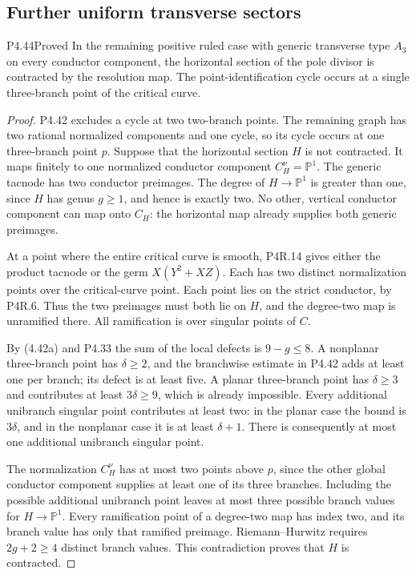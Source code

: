 \subsection{Further uniform transverse sectors}

\begin{statement}{P4.44}{Proved}
In the remaining positive ruled case with generic transverse
type $A_3$ on every conductor component, the horizontal
section of the pole divisor is contracted by the resolution
map. The point-identification cycle occurs at a single
three-branch point of the critical curve.
\end{statement}
\begin{proof}
P4.42 excludes a cycle at two two-branch points. The
remaining graph has two rational normalized components
and one cycle, so its cycle occurs at one three-branch
point $p$. Suppose that the horizontal section $H$ is
not contracted. It maps finitely to one normalized
conductor component $C_H^\nu=\mathbb P^1$.
The generic tacnode has two conductor preimages.
The degree of $H\to\mathbb P^1$ is greater than one,
since $H$ has genus $g\ge1$, and hence is exactly two.
No other, vertical conductor component can map onto
$C_H$: the horizontal map already supplies both generic
preimages.

At a point where the entire critical curve is smooth,
P4R.14 gives either the product tacnode or the germ
$X(Y^2+XZ)$. Each has two distinct normalization points
over the critical-curve point. Each point lies on the
strict conductor, by P4R.6. Thus the two preimages must
both lie on $H$, and the degree-two map is unramified
there. All ramification is over singular points of $C$.

By (4.42a) and P4.33 the sum of the local defects is
$9-g\le8$. A nonplanar three-branch point has
$\delta\ge2$, and the branchwise estimate in P4.42
adds at least one per branch; its defect is at least
five. A planar three-branch point has $\delta\ge3$
and contributes at least $3\delta\ge9$, which is
already impossible. Every additional unibranch singular
point contributes at least two: in the planar case
the bound is $3\delta$, and in the nonplanar case it is
at least $\delta+1$. There is consequently at most one
additional unibranch singular point.

The normalization $C_H^\nu$ has at most two points
above $p$, since the other global conductor component
supplies at least one of its three branches. Including
the possible additional unibranch point leaves at most
three possible branch values for $H\to\mathbb P^1$.
Every ramification point of a degree-two map has index
two, and its branch value has only that ramified
preimage. Riemann--Hurwitz requires $2g+2\ge4$ distinct
branch values. This contradiction proves that $H$ is
contracted.
\end{proof}

